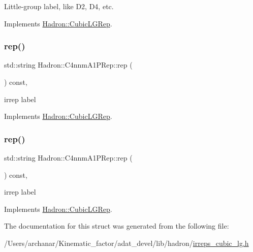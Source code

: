 Little-\/group label, like D2, D4, etc. 

Implements \mbox{\hyperlink{structHadron_1_1CubicLGRep_a9bdb14b519a611d21379ed96a3a9eb41}{Hadron\+::\+Cubic\+L\+G\+Rep}}.

\mbox{\label{structHadron_1_1C4nnmA1PRep_a8f1a89bb3b5609a412f723569c90d508}} 
\subsubsection{\texorpdfstring{rep()}{rep()}\hspace{0.1cm}{\footnotesize\ttfamily [1/2]}}
{\footnotesize\ttfamily std\+::string Hadron\+::\+C4nnm\+A1\+P\+Rep\+::rep (\begin{DoxyParamCaption}{ }\end{DoxyParamCaption}) const\hspace{0.3cm}{\ttfamily [inline]}, {\ttfamily [virtual]}}

irrep label 

Implements \mbox{\hyperlink{structHadron_1_1CubicLGRep_a50f5ddbb8f4be4cee0106fa9e8c75e6c}{Hadron\+::\+Cubic\+L\+G\+Rep}}.

\mbox{\label{structHadron_1_1C4nnmA1PRep_a8f1a89bb3b5609a412f723569c90d508}} 
\subsubsection{\texorpdfstring{rep()}{rep()}\hspace{0.1cm}{\footnotesize\ttfamily [2/2]}}
{\footnotesize\ttfamily std\+::string Hadron\+::\+C4nnm\+A1\+P\+Rep\+::rep (\begin{DoxyParamCaption}{ }\end{DoxyParamCaption}) const\hspace{0.3cm}{\ttfamily [inline]}, {\ttfamily [virtual]}}

irrep label 

Implements \mbox{\hyperlink{structHadron_1_1CubicLGRep_a50f5ddbb8f4be4cee0106fa9e8c75e6c}{Hadron\+::\+Cubic\+L\+G\+Rep}}.



The documentation for this struct was generated from the following file\+:\begin{DoxyCompactItemize}
\item 
/\+Users/archanar/\+Kinematic\+\_\+factor/adat\+\_\+devel/lib/hadron/\mbox{\hyperlink{lib_2hadron_2irreps__cubic__lg_8h}{irreps\+\_\+cubic\+\_\+lg.\+h}}\end{DoxyCompactItemize}
